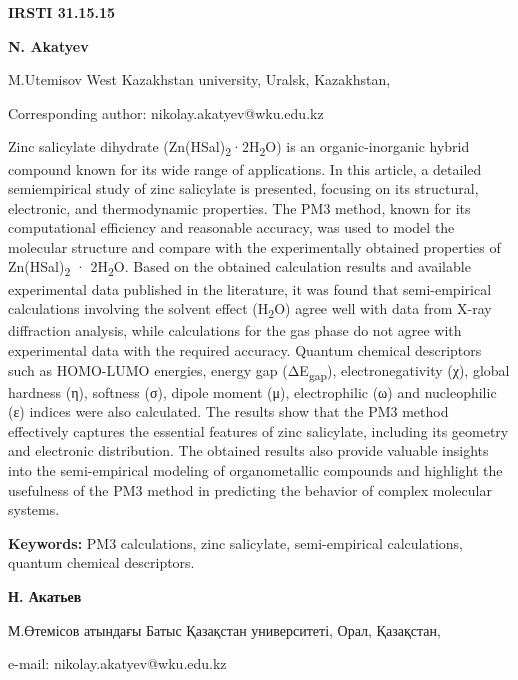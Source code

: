 \newpage
{\bfseries IRSTI 31.15.15}


\begin{center}
{\bfseries N. Akatyev}

M.Utemisov West Kazakhstan university, Uralsk, Kazakhstan,

Corresponding author: nikolay.akatyev@wku.edu.kz
\end{center}

Zinc salicylate dihydrate
(Zn(HSal)\textsubscript{2}·2H\textsubscript{2}O) is an organic-inorganic
hybrid compound known for its wide range of applications. In this
article, a detailed semiempirical study of zinc salicylate is presented,
focusing on its structural, electronic, and thermodynamic properties.
The PM3 method, known for its computational efficiency and reasonable
accuracy, was used to model the molecular structure and compare with the
experimentally obtained properties of
Zn(HSal)\textsubscript{2} · 2H\textsubscript{2}O. Based on the obtained
calculation results and available experimental data published in the
literature, it was found that semi-empirical calculations involving the
solvent effect (H\textsubscript{2}O) agree well with data from X-ray
diffraction analysis, while calculations for the gas phase do not agree
with experimental data with the required accuracy. Quantum chemical
descriptors such as HOMO-LUMO energies, energy gap
(ΔE\textsubscript{gap}), electronegativity (χ), global hardness (η),
softness (σ), dipole moment (μ), electrophilic (ω) and nucleophilic (ε)
indices were also calculated. The results show that the PM3 method
effectively captures the essential features of zinc salicylate,
including its geometry and electronic distribution. The obtained results
also provide valuable insights into the semi-empirical modeling of
organometallic compounds and highlight the usefulness of the PM3 method
in predicting the behavior of complex molecular systems.

{\bfseries Keywords:} PM3 calculations, zinc salicylate, semi-empirical
calculations, quantum chemical descriptors.


\begin{center}
{\bfseries Н. Акатьев}

М.Өтемісов атындағы Батыс Қазақстан университеті, Орал, Қазақстан,

e-mail: nikolay.akatyev@wku.edu.kz
\end{center}

